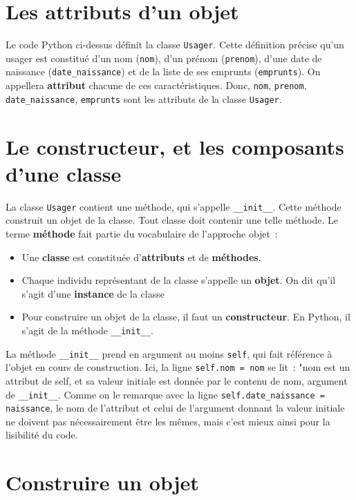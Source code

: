\documentclass{article}
\begin{document}
\section{Les attributs d'un objet}

Le code Python ci-dessus définit la classe \texttt{Usager}. Cette définition précise qu'un usager est constitué d'un nom (\texttt{nom}), d'un prénom (\texttt{prenom}), d'une date de naissance (\texttt{date\_naissance}) et de la liste de ses emprunts (\texttt{emprunts}). On appellera \textbf{attribut} chacune de ces caractéristiques. Donc, \texttt{nom}, \texttt{prenom}, \texttt{date\_naissance}, \texttt{emprunts} sont les attributs de la classe \texttt{Usager}.

\section{Le constructeur, et les composants d'une classe}

La classe \texttt{Usager} contient une méthode, qui s'appelle \texttt{\_\_init\_\_}. Cette méthode construit un objet de la classe. Tout classe doit contenir une telle méthode. Le terme \textbf{méthode} fait partie du vocabulaire de l'approche objet~:

\begin{itemize}
\item Une \textbf{classe} est constituée d'\textbf{attributs} et de \textbf{méthodes}.
\item Chaque individu représentant de la  classe s'appelle un \textbf{objet}. On dit qu'il s'agit d'une \textbf{instance} de la classe
\item Pour construire un objet de la classe, il faut un \textbf{constructeur}. En Python, il s'agit de la méthode  \texttt{\_\_init\_\_}. 
\end{itemize}

La méthode \texttt{\_\_init\_\_} prend en argument au moins \texttt{self}, qui fait référence à l'objet en cours de construction. Ici, la ligne \texttt{self.nom = nom} se lit~: "nom est un attribut de self, et sa valeur initiale est donnée par le contenu de nom, argument de \texttt{\_\_init\_\_}. Comme on le remarque avec la ligne \texttt{self.date\_naissance = naissance}, le nom de l'attribut et celui de l'argument donnant la valeur initiale ne doivent pas nécessairement être les mêmes, mais c'est mieux ainsi pour la lisibilité du code.

\section{Construire un objet}
\end{document}

